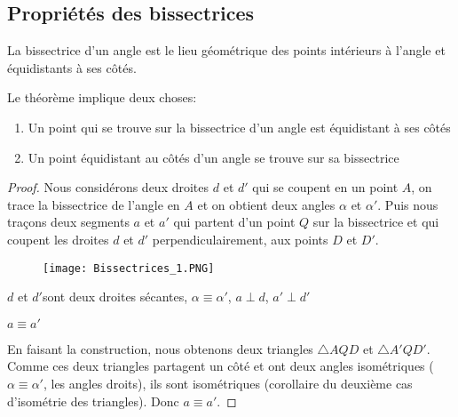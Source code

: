 \documentclass[a4paper,12pt]{article}
\begin{document}
\pagebreak
\subsection{Propriétés des bissectrices}
\begin{theorem}
La bissectrice d'un angle est le lieu géométrique des points intérieurs à l'angle et équidistants à ses côtés.
\end{theorem}
Le théorème implique deux choses:
\begin{enumerate}
\item Un point qui se trouve sur la bissectrice d'un angle est équidistant à ses côtés
\item Un point équidistant au côtés d'un angle se trouve sur sa bissectrice
\end{enumerate}
\begin{proof}
Nous considérons deux droites $d$ et $d'$ qui se coupent en un point $A$, on trace la bissectrice de l'angle en $A$ et on obtient deux angles $\alpha$ et $\alpha'$. Puis nous traçons deux segments $a$ et $a'$ qui partent d'un point $Q$ sur la bissectrice et qui coupent les droites $d$ et $d'$ perpendiculairement, aux points $D$ et $D'$.
\begin{figure}[H]
    \centering
    \texttt{[image: Bissectrices\_1.PNG]}
\end{figure}


\begin{hyp}
$d$ et $d'$sont deux droites sécantes, $\alpha \equiv \alpha'$, $a\perp d$, $a' \perp d'$
\end{hyp}
\begin{concl}
$a\equiv a'$
\end{concl}
En faisant la construction, nous obtenons deux triangles $\triangle AQD$ et $\triangle A'QD'$. Comme ces deux triangles partagent un côté et ont deux angles isométriques ($\alpha \equiv \alpha'$, les angles droits), ils sont isométriques (corollaire du deuxième cas d'isométrie des triangles). Donc $a \equiv a'$.
\end{proof}
\end{document}
